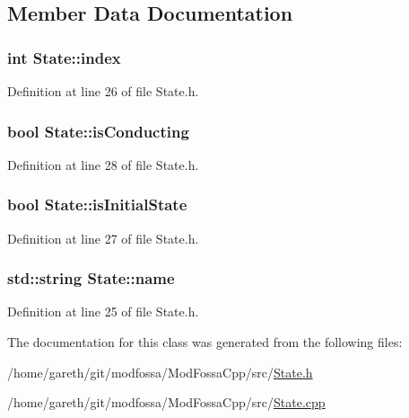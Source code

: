 \subsection{Member Data Documentation}
\hypertarget{classState_a91451f2d71245fba7cfe1d2ff248c13c}{
\subsubsection[{index}]{\setlength{\rightskip}{0pt plus 5cm}int {\bf State::index}}}
\label{classState_a91451f2d71245fba7cfe1d2ff248c13c}


Definition at line 26 of file State.h.

\hypertarget{classState_a5d20171d44b393ae9bad5cd61d1e8f45}{
\subsubsection[{isConducting}]{\setlength{\rightskip}{0pt plus 5cm}bool {\bf State::isConducting}}}
\label{classState_a5d20171d44b393ae9bad5cd61d1e8f45}


Definition at line 28 of file State.h.

\hypertarget{classState_a3f648ae24fee45cce26ce51bbe93deb4}{
\subsubsection[{isInitialState}]{\setlength{\rightskip}{0pt plus 5cm}bool {\bf State::isInitialState}}}
\label{classState_a3f648ae24fee45cce26ce51bbe93deb4}


Definition at line 27 of file State.h.

\hypertarget{classState_ad57f19fd0a86f129840d8739253d2c72}{
\subsubsection[{name}]{\setlength{\rightskip}{0pt plus 5cm}std::string {\bf State::name}}}
\label{classState_ad57f19fd0a86f129840d8739253d2c72}


Definition at line 25 of file State.h.



The documentation for this class was generated from the following files:\begin{DoxyCompactItemize}
\item 
/home/gareth/git/modfossa/ModFossaCpp/src/\hyperlink{State_8h}{State.h}\item 
/home/gareth/git/modfossa/ModFossaCpp/src/\hyperlink{State_8cpp}{State.cpp}\end{DoxyCompactItemize}
